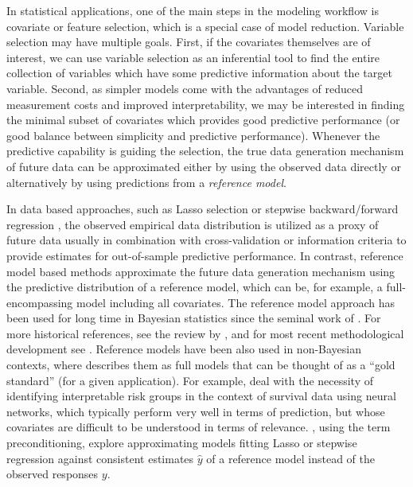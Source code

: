 \documentclass[american,]{article}
\theoremstyle{definition}
\begin{document}
In statistical applications, one of the main steps in the modeling
workflow is covariate or feature selection, which is a special case of
model reduction. Variable selection may have multiple goals. 
First, if the covariates themselves are of interest,
we can use variable selection as an inferential tool to find the entire 
collection of variables which have some predictive information about the target variable.
Second, as simpler models come with the advantages of reduced
measurement costs and improved interpretability, we may be interested in
finding the minimal subset of covariates which
provides good predictive performance (or good balance between simplicity and
predictive performance). 
Whenever the predictive capability is guiding the selection, the true data generation
mechanism of future data can be approximated either by using the observed data directly or
alternatively by using predictions from a \emph{reference model}.

In data based approaches, such as Lasso selection
\citep{tibshirani1996regression} or stepwise backward/forward 
regression \citep{venables2013modern,harrell2015regression}, the observed empirical data distribution is utilized as a
proxy of future data usually in combination with cross-validation
or information criteria to provide estimates for out-of-sample
predictive performance.
In contrast, reference model based methods approximate the future data generation
mechanism using the predictive distribution of a reference model,
which can be, for example, a full-encompassing model including all
covariates. The reference
model approach has been used for long time in Bayesian statistics
since the seminal work of \citet{paper:reference_lindley}. For more
historical references, see the review by \citet{vehtari2012survey}, and for
most recent methodological development see 
\citet{paper:projpred}.
Reference models have been also used in non-Bayesian contexts,
where \cite{harrell2015regression} describes them as full models that
can be thought of as a ``gold standard'' (for a given application).
For example,
\cite{faraggi2001understanding} deal with the necessity of identifying
interpretable risk groups in the context of survival data using neural
networks, which typically perform very well in terms of prediction,
but whose covariates are difficult to be understood in terms of
relevance. 
\cite{paul2008preconditioning}, using the term preconditioning,
explore approximating models fitting Lasso or stepwise regression
against consistent estimates $\hat{y}$ of a reference model instead of
the observed responses $y$.
\end{document}
